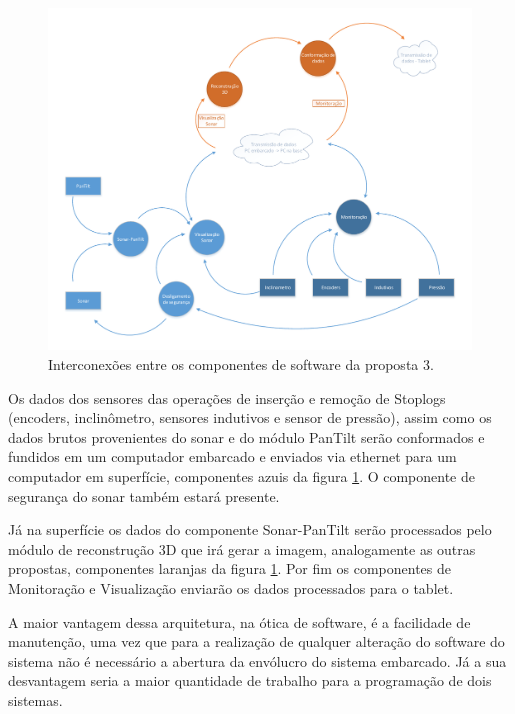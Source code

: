 \begin{figure}[H]
\centering
\includegraphics[width=\textwidth,height=\textheight,keepaspectratio]{figs/software/EstrutSoft/prop1_soft_3.pdf}
\caption{Interconexões entre os componentes de software da proposta 3.}
\label{fig:ES:3}
\end{figure}

Os dados dos sensores das operações de inserção e remoção de Stoplogs (encoders,
inclinômetro, sensores indutivos e sensor de pressão), assim como os dados
brutos provenientes do sonar e do módulo PanTilt serão conformados e fundidos em
um computador embarcado e enviados via ethernet para um computador em
superfície, componentes azuis da figura \ref{fig:ES:3}. O componente de
segurança do sonar também estará presente.



Já na superfície os dados do componente Sonar-PanTilt serão processados pelo
módulo de reconstrução 3D que irá gerar a imagem, analogamente as outras
propostas, componentes laranjas da figura \ref{fig:ES:3}.
Por fim os componentes de Monitoração e Visualiza\-ção enviarão os dados
processados para o tablet.

A maior vantagem dessa arquitetura, na ótica de software, é a facilidade de
manutenção, uma vez que para a realização de qualquer alteração do software do
sistema não é necessário a abertura da envólucro do sistema embarcado. Já a sua
desvantagem seria a maior quantidade de trabalho para a programação de dois
sistemas.